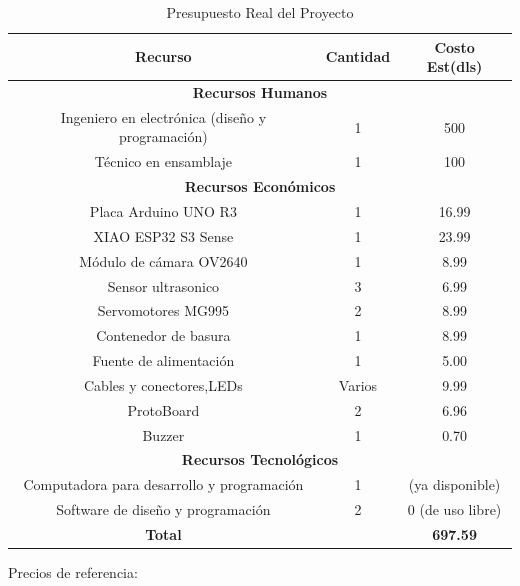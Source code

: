 \begin{table}[H]
    \centering
    \begin{tabular}{|c|c|c|}
        \hline
        \textbf{Recurso} & \textbf{Cantidad} & \textbf{Costo Est(dls)} \\
        \hline
        \multicolumn{3}{|c|}{\textbf{Recursos Humanos}} \\
        \hline
        Ingeniero en electrónica (diseño y programación) & 1 & 500 \\
        \hline
        Técnico en ensamblaje & 1 & 100 \\
        \hline
        \multicolumn{3}{|c|}{\textbf{Recursos Económicos}} \\
        \hline
        Placa Arduino UNO R3 & 1 & 16.99\\
        \hline
        XIAO ESP32 S3 Sense  & 1 & 23.99 \\
        \hline
        Módulo de cámara OV2640 & 1 & 8.99\\
        \hline
        Sensor ultrasonico & 3 & 6.99 \\
        \hline
        Servomotores MG995 & 2 & 8.99 \\
        \hline
        Contenedor de basura & 1 & 8.99 \\
        \hline
        Fuente de alimentación & 1 & 5.00 \\
        \hline
        Cables y conectores,LEDs & Varios & 9.99 \\
        \hline
        ProtoBoard & 2 & 6.96 \\
        \hline
        Buzzer & 1 & 0.70\\
        \hline
        \multicolumn{3}{|c|}{\textbf{Recursos Tecnológicos}} \\
        \hline
        Computadora para desarrollo y programación & 1 & (ya disponible)\\
        \hline
        Software de diseño y programación & 2 & 0 (de uso libre) \\
        \hline
        \textbf{Total} & & \textbf{697.59} \\
        \hline
    \end{tabular}
    \caption{Presupuesto Real del Proyecto}{Precios de referencia:~\cite{link_arduino,link_esp32,link_servos,link_conectores_cables,link_protoboard,link_buzzer}}
    \label{tab:presupuesto_real}
\end{table}

